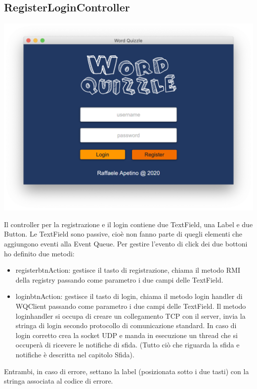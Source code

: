 \documentclass{article}
\begin{document}
\subsection{RegisterLoginController}
\begin{center}
\includegraphics[scale=0.5]{quizzleloginregister.png}
\end{center}
Il controller per la registrazione e il login contiene due TextField, una Label e due Button. Le TextField sono passive, cioè non fanno parte di quegli elementi che aggiungono eventi alla Event Queue. Per gestire l'evento di click dei due bottoni ho definito due metodi:
\begin{itemize}
    \item registerbtnAction: gestisce il tasto di registrazione, chiama il metodo RMI della registry passando come parametro i due campi delle TextField.
    \item loginbtnAction: gestisce il tasto di login, chiama il metodo login handler di WQClient passando come parametro i due campi delle TextField. Il metodo login\textunderscore handler si occupa di creare un collegamento TCP con il server, invia la stringa di login secondo protocollo di comunicazione standard. In caso di login corretto crea la socket UDP e manda in esecuzione un thread che si occuperà di ricevere le notifiche di sfida. (Tutto ciò che riguarda la sfida e notifiche è descritta nel capitolo Sfida). 
\end{itemize}
Entrambi, in caso di errore, settano la label (posizionata sotto i due tasti) con la stringa associata al codice di errore.
\end{document}
